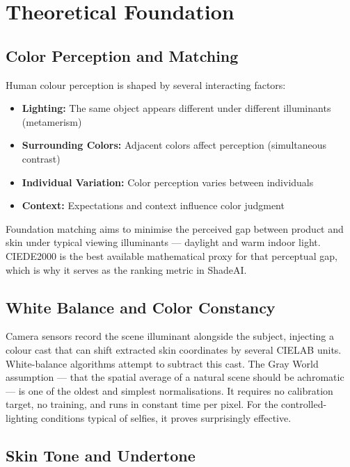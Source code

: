 \section{Theoretical Foundation}

\subsection{Color Perception and Matching}

Human colour perception is shaped by several interacting factors:

\begin{itemize}
    \item \textbf{Lighting:} The same object appears different under different illuminants (metamerism)
    \item \textbf{Surrounding Colors:} Adjacent colors affect perception (simultaneous contrast)
    \item \textbf{Individual Variation:} Color perception varies between individuals
    \item \textbf{Context:} Expectations and context influence color judgment
\end{itemize}

Foundation matching aims to minimise the perceived gap between product and skin under typical viewing illuminants — daylight and warm indoor light. CIEDE2000 is the best available mathematical proxy for that perceptual gap, which is why it serves as the ranking metric in ShadeAI.

\subsection{White Balance and Color Constancy}

Camera sensors record the scene illuminant alongside the subject, injecting a colour cast that can shift extracted skin coordinates by several CIELAB units. White-balance algorithms attempt to subtract this cast. The Gray World assumption — that the spatial average of a natural scene should be achromatic — is one of the oldest and simplest normalisations. It requires no calibration target, no training, and runs in constant time per pixel. For the controlled-lighting conditions typical of selfies, it proves surprisingly effective.

\subsection{Skin Tone and Undertone}

